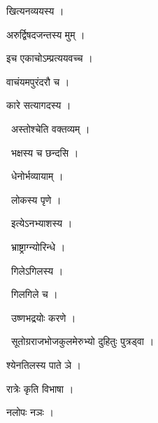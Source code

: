 \documentclass[10pt, openany, oneside]{book}
\begin{document}
\noindent खित्यनव्ययस्य ।

\noindent अरुर्द्विषदजन्तस्य मुम् ।

\noindent इच एकाचोऽम्प्रत्ययवच्च ।

\noindent वाचंयमपुरंदरौ च ।

\noindent कारे सत्यागदस्य ।

\par\noindent\hspace{1.5em}{\vps वा॰}~{\qt अस्तोश्चेति वक्तव्यम् ।}

\par\noindent\hspace{1.5em}{\vps वा॰}~{\qt भक्षस्य च छन्दसि ।}

\par\noindent\hspace{1.5em}{\vps वा॰}~{\qt धेनोर्भव्यायाम् ।}

\par\noindent\hspace{1.5em}{\vps वा॰}~{\qt लोकस्य पृणे ।}

\par\noindent\hspace{1.5em}{\vps वा॰}~{\qt इत्येऽनभ्याशस्य ।}

\par\noindent\hspace{1.5em}{\vps वा॰}~{\qt भ्राष्ट्राग्न्योरिन्धे ।}

\par\noindent\hspace{1.5em}{\vps वा॰}~{\qt गिलेऽगिलस्य  ।}

\par\noindent\hspace{1.5em}{\vps वा॰}~{\qt गिलगिले च ।}

\par\noindent\hspace{1.5em}{\vps वा॰}~{\qt उष्णभद्रयोः करणे ।}

\par\noindent\hspace{1.5em}{\vps वा॰}~{\qt सूतोग्रराजभोजकुलमेरुभ्यो दुहितुः पुत्रड्वा ।}

\noindent श्येनतिलस्य पाते ञे ।

\noindent रात्रेः कृति विभाषा ।

\noindent नलोपः नञः ।
\end{document}
